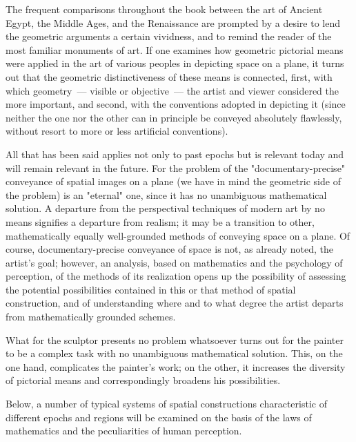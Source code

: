 The frequent comparisons throughout the book between the art of Ancient Egypt, the
Middle Ages, and the Renaissance are prompted by a desire to lend the geometric
arguments a certain vividness, and to remind the reader of the most familiar monuments
of art. If one examines how geometric pictorial means were applied in the art of various
peoples in depicting space on a plane, it turns out that the geometric distinctiveness of
these means is connected, first, with which geometry~--- visible or objective~--- the artist
and viewer considered the more important, and second, with the conventions adopted in
depicting it (since neither the one nor the other can in principle be conveyed absolutely
flawlessly, without resort to more or less artificial conventions).

All that has been said applies not only to past epochs but is relevant today and will
remain relevant in the future. For the problem of the "documentary-precise" conveyance
of spatial images on a plane (we have in mind the geometric side of the problem) is an
"eternal" one, since it has no unambiguous mathematical solution. A departure from the
perspectival techniques of modern art by no means signifies a departure from realism;
it may be a transition to other, mathematically equally well-grounded methods of
conveying space on a plane. Of course, documentary-precise conveyance of space is not,
as already noted, the artist's goal; however, an analysis, based on mathematics and the
psychology of perception, of the methods of its realization opens up the possibility of
assessing the potential possibilities contained in this or that method of spatial
construction, and of understanding where and to what degree the artist departs from
mathematically grounded schemes.

What for the sculptor presents no problem whatsoever turns out for the painter to be a
complex task with no unambiguous mathematical solution. This, on the one hand,
complicates the painter's work; on the other, it increases the diversity of pictorial means
and correspondingly broadens his possibilities.

Below, a number of typical systems of spatial constructions characteristic of different
epochs and regions will be examined on the basis of the laws of mathematics and the
peculiarities of human perception.
